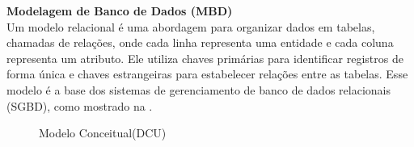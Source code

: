     \textbf{Modelagem de Banco de Dados (MBD)} \\
    Um modelo relacional é uma abordagem para organizar dados em tabelas, chamadas de relações, onde cada linha representa uma entidade e cada coluna representa um atributo. Ele utiliza chaves primárias para identificar registros de forma única e chaves estrangeiras para estabelecer relações entre as tabelas. Esse modelo é a base dos sistemas de gerenciamento de banco de dados relacionais (SGBD), como mostrado na . 
    \begin{figure}[H]
        \centering
        \caption{Modelo Conceitual(DCU)}%
        \label{phot:pg-13}
    \end{figure}

